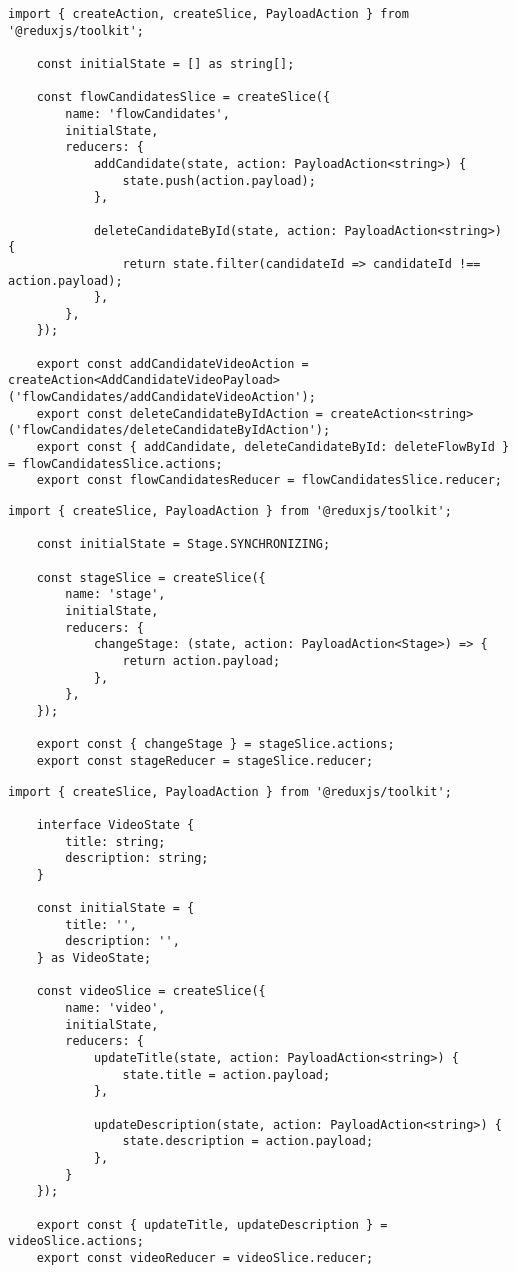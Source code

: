 \begin{lstlisting}[caption={flow-candidates/slice.ts}]
	import { createAction, createSlice, PayloadAction } from '@reduxjs/toolkit';
	
	const initialState = [] as string[];
	
	const flowCandidatesSlice = createSlice({
		name: 'flowCandidates',
		initialState,
		reducers: {
			addCandidate(state, action: PayloadAction<string>) {
				state.push(action.payload);
			},
			
			deleteCandidateById(state, action: PayloadAction<string>) {
				return state.filter(candidateId => candidateId !== action.payload);
			},
		},
	});
	
	export const addCandidateVideoAction = createAction<AddCandidateVideoPayload>('flowCandidates/addCandidateVideoAction');
	export const deleteCandidateByIdAction = createAction<string>('flowCandidates/deleteCandidateByIdAction');
	export const { addCandidate, deleteCandidateById: deleteFlowById } = flowCandidatesSlice.actions;
	export const flowCandidatesReducer = flowCandidatesSlice.reducer;
\end{lstlisting}

\begin{lstlisting}[caption={stage/slice.ts}]
	import { createSlice, PayloadAction } from '@reduxjs/toolkit';
	
	const initialState = Stage.SYNCHRONIZING;
	
	const stageSlice = createSlice({
		name: 'stage',
		initialState,
		reducers: {
			changeStage: (state, action: PayloadAction<Stage>) => {
				return action.payload;
			},
		},
	});
	
	export const { changeStage } = stageSlice.actions;
	export const stageReducer = stageSlice.reducer;
\end{lstlisting}

\begin{lstlisting}[caption={video/slice.ts}]
	import { createSlice, PayloadAction } from '@reduxjs/toolkit';
	
	interface VideoState {
		title: string;
		description: string;
	}
	
	const initialState = {
		title: '',
		description: '',
	} as VideoState;
	
	const videoSlice = createSlice({
		name: 'video',
		initialState,
		reducers: {
			updateTitle(state, action: PayloadAction<string>) {
				state.title = action.payload;
			},
			
			updateDescription(state, action: PayloadAction<string>) {
				state.description = action.payload;
			},
		}
	});
	
	export const { updateTitle, updateDescription } = videoSlice.actions;
	export const videoReducer = videoSlice.reducer;
\end{lstlisting}

